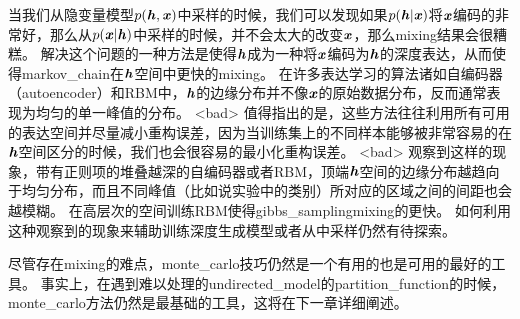 当我们从隐变量模型$p(\boldsymbol{\mathit{h}},\boldsymbol{\mathit{x}})$中采样的时候，我们可以发现如果$p(\boldsymbol{\mathit{h}}\vert \boldsymbol{\mathit{x}})$将$\boldsymbol{\mathit{x}}$编码的非常好，那么从$p(\boldsymbol{\mathit{x}} \vert \boldsymbol{\mathit{h}})$中采样的时候，并不会太大的改变$\boldsymbol{\mathit{x}}$，那么\gls{mixing}结果会很糟糕。
解决这个问题的一种方法是使得$\boldsymbol{\mathit{h}}$成为一种将$\boldsymbol{\mathit{x}}$编码为$\boldsymbol{\mathit{h}}$的深度表达，从而使得\gls{markov_chain}在$\boldsymbol{\mathit{h}}$空间中更快的\gls{mixing}。
在许多表达学习的算法诸如自编码器（autoencoder）和\gls{RBM}中，$\boldsymbol{\mathit{h}}$的边缘分布并不像$\boldsymbol{\mathit{x}}$的原始数据分布，反而通常表现为均匀的单一峰值的分布。
<bad> 值得指出的是，这些方法往往利用所有可用的表达空间并尽量减小重构误差，因为当训练集上的不同样本能够被非常容易的在$\boldsymbol{\mathit{h}}$空间区分的时候，我们也会很容易的最小化重构误差。
<bad> \citep{Bengio-et-al-ICML2013-small}观察到这样的现象，带有正则项的堆叠越深的自编码器或者\gls{RBM}，顶端$\boldsymbol{\mathit{h}}$空间的边缘分布越趋向于均匀分布，而且不同峰值（比如说实验中的类别）所对应的区域之间的间距也会越模糊。
在高层次的空间训练\gls{RBM}使得\gls{gibbs_sampling}\gls{mixing}的更快。
如何利用这种观察到的现象来辅助训练深度生成模型或者从中采样仍然有待探索。

尽管存在\gls{mixing}的难点，\gls{monte_carlo}技巧仍然是一个有用的也是可用的最好的工具。
事实上，在遇到难以处理的\gls{undirected_model}的\gls{partition_function}的时候，\gls{monte_carlo}方法仍然是最基础的工具，这将在下一章详细阐述。












